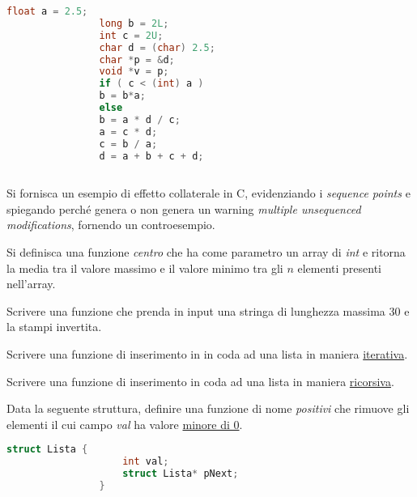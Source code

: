\documentclass[addpoints,11pt]{exam}
\begin{document}
\begin{questions}
		\begin{minipage}[t]{0.5\linewidth}
			\begin{lstlisting}[language=C]
				float a = 2.5;
				long b = 2L;
				int c = 2U;
				char d = (char) 2.5;
				char *p = &d;
				void *v = p;
				if ( c < (int) a )
				b = b*a;
				else
				b = a * d / c;
				a = c * d;
				c = b / a;
				d = a + b + c + d;
				
			\end{lstlisting}
		\end{minipage}
		\begin{minipage}[t]{0.5\linewidth}
			\makeemptybox{145pt}
		\end{minipage}
		
		
		
		\question[1]
		Si fornisca un esempio di effetto collaterale in C, evidenziando i \emph{sequence points} e spiegando perché genera o non genera un warning \emph{multiple unsequenced modifications}, fornendo un controesempio.
		\makeemptybox{75pt}
		
		
		
		\question[2]
		Si definisca una funzione \emph{centro} che ha come parametro un array di \emph{int} e ritorna la media tra il valore massimo e il valore minimo tra gli $n$ elementi presenti nell'array.
		\makeemptybox{100pt}
		
		
		
		\question[2]
		Scrivere una funzione che prenda in input una stringa di lunghezza massima 30 e la stampi invertita.
		\makeemptybox{100pt}
		
		
		
		\question[1]
		Scrivere una funzione di inserimento in in coda ad una lista in maniera \underline{iterativa}.
		\makeemptybox{100pt}
		
		
		
		\question[2]
		Scrivere una funzione di inserimento in coda ad una lista in maniera \underline{ricorsiva}.
		\makeemptybox{100pt}
		
		
		
		\question[4]
		Data la seguente struttura, definire una funzione di nome \emph{positivi} che rimuove gli elementi il cui campo \emph{val} ha valore \underline{minore di 0}.
		
		\begin{minipage}{0.3\linewidth}
			\begin{lstlisting}[language=C]
				struct Lista {
					int val;
					struct Lista* pNext;
				}
			\end{lstlisting}
		\end{minipage}
		\begin{minipage}{0.7\linewidth}
			\makeemptybox{100pt}
		\end{minipage}
		

\end{questions}
\end{document}
